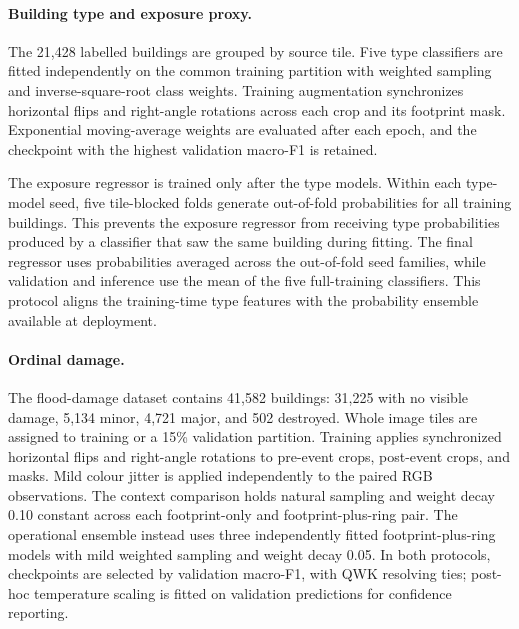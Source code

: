 
\paragraph{Building type and exposure proxy.}
The 21,428 labelled buildings are grouped by source tile. Five type classifiers are fitted independently on the common training partition with weighted sampling and inverse-square-root class weights. Training augmentation synchronizes horizontal flips and right-angle rotations across each crop and its footprint mask. Exponential moving-average weights are evaluated after each epoch, and the checkpoint with the highest validation macro-F1 is retained.

The exposure regressor is trained only after the type models. Within each type-model seed, five tile-blocked folds generate out-of-fold probabilities for all training buildings. This prevents the exposure regressor from receiving type probabilities produced by a classifier that saw the same building during fitting. The final regressor uses probabilities averaged across the out-of-fold seed families, while validation and inference use the mean of the five full-training classifiers. This protocol aligns the training-time type features with the probability ensemble available at deployment.


\paragraph{Ordinal damage.}
The flood-damage dataset contains 41,582 buildings: 31,225 with no visible damage, 5,134 minor, 4,721 major, and 502 destroyed. Whole image tiles are assigned to training or a 15\% validation partition. Training applies synchronized horizontal flips and right-angle rotations to pre-event crops, post-event crops, and masks. Mild colour jitter is applied independently to the paired RGB observations. The context comparison holds natural sampling and weight decay 0.10 constant across each footprint-only and footprint-plus-ring pair. The operational ensemble instead uses three independently fitted footprint-plus-ring models with mild weighted sampling and weight decay 0.05. In both protocols, checkpoints are selected by validation macro-F1, with QWK resolving ties; post-hoc temperature scaling is fitted on validation predictions for confidence reporting.

